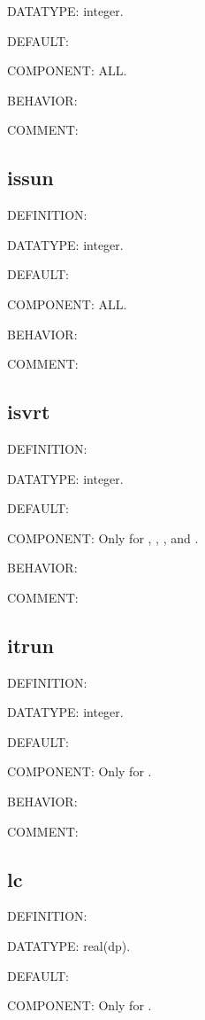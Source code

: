 {\color{green}DATATYPE:} integer.

{\color{blue}DEFAULT:}

{\color{brown}COMPONENT:} ALL.

{\color{purple}BEHAVIOR:}

{\color{olive}COMMENT:}

\subsection{issun}
{\color{red}DEFINITION:}

{\color{green}DATATYPE:} integer.

{\color{blue}DEFAULT:}

{\color{brown}COMPONENT:} ALL.

{\color{purple}BEHAVIOR:}

{\color{olive}COMMENT:}

\subsection{isvrt}
{\color{red}DEFINITION:}

{\color{green}DATATYPE:} integer.

{\color{blue}DEFAULT:}

{\color{brown}COMPONENT:} Only for {\gardenia}, {\narcissus}, {\lavender}, and {\manjushaka}.

{\color{purple}BEHAVIOR:}

{\color{olive}COMMENT:}

\subsection{itrun}
{\color{red}DEFINITION:}

{\color{green}DATATYPE:} integer.

{\color{blue}DEFAULT:}

{\color{brown}COMPONENT:} Only for {\manjushaka}.

{\color{purple}BEHAVIOR:}

{\color{olive}COMMENT:}

\subsection{lc}
{\color{red}DEFINITION:}

{\color{green}DATATYPE:} real(dp).

{\color{blue}DEFAULT:}

{\color{brown}COMPONENT:} Only for {\narcissus}.

